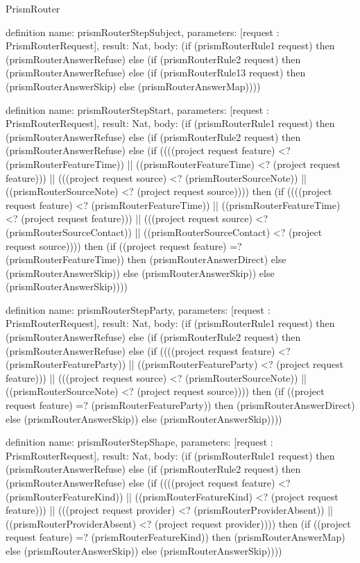 \begin{lexlean}{PrismRouter}
\begin{semanticmodule}
definition{
  name: prismRouterStepSubject,
  parameters: [request : PrismRouterRequest],
  result: Nat,
  body: (if (prismRouterRule1 request) then (prismRouterAnswerRefuse) else (if (prismRouterRule2 request) then (prismRouterAnswerRefuse) else (if (prismRouterRule13 request) then (prismRouterAnswerSkip) else (prismRouterAnswerMap))))
}

definition{
  name: prismRouterStepStart,
  parameters: [request : PrismRouterRequest],
  result: Nat,
  body: (if (prismRouterRule1 request) then (prismRouterAnswerRefuse) else (if (prismRouterRule2 request) then (prismRouterAnswerRefuse) else (if ((((project request feature) <? (prismRouterFeatureTime)) || ((prismRouterFeatureTime) <? (project request feature))) || (((project request source) <? (prismRouterSourceNote)) || ((prismRouterSourceNote) <? (project request source)))) then (if ((((project request feature) <? (prismRouterFeatureTime)) || ((prismRouterFeatureTime) <? (project request feature))) || (((project request source) <? (prismRouterSourceContact)) || ((prismRouterSourceContact) <? (project request source)))) then (if ((project request feature) =? (prismRouterFeatureTime)) then (prismRouterAnswerDirect) else (prismRouterAnswerSkip)) else (prismRouterAnswerSkip)) else (prismRouterAnswerSkip))))
}

definition{
  name: prismRouterStepParty,
  parameters: [request : PrismRouterRequest],
  result: Nat,
  body: (if (prismRouterRule1 request) then (prismRouterAnswerRefuse) else (if (prismRouterRule2 request) then (prismRouterAnswerRefuse) else (if ((((project request feature) <? (prismRouterFeatureParty)) || ((prismRouterFeatureParty) <? (project request feature))) || (((project request source) <? (prismRouterSourceNote)) || ((prismRouterSourceNote) <? (project request source)))) then (if ((project request feature) =? (prismRouterFeatureParty)) then (prismRouterAnswerDirect) else (prismRouterAnswerSkip)) else (prismRouterAnswerSkip))))
}

definition{
  name: prismRouterStepShape,
  parameters: [request : PrismRouterRequest],
  result: Nat,
  body: (if (prismRouterRule1 request) then (prismRouterAnswerRefuse) else (if (prismRouterRule2 request) then (prismRouterAnswerRefuse) else (if ((((project request feature) <? (prismRouterFeatureKind)) || ((prismRouterFeatureKind) <? (project request feature))) || (((project request provider) <? (prismRouterProviderAbsent)) || ((prismRouterProviderAbsent) <? (project request provider)))) then (if ((project request feature) =? (prismRouterFeatureKind)) then (prismRouterAnswerMap) else (prismRouterAnswerSkip)) else (prismRouterAnswerSkip))))
}


\end{semanticmodule}
\end{lexlean}
